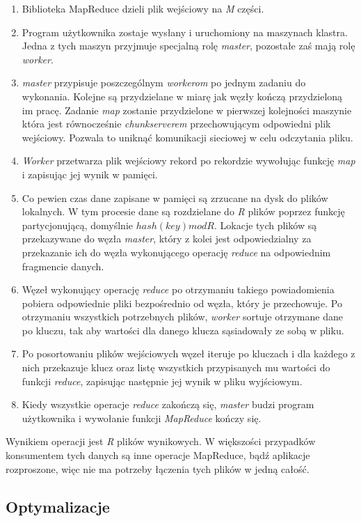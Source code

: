 \begin{enumerate}
 \item Biblioteka MapReduce dzieli plik wejściowy na \emph{M} części.
 \item Program użytkownika zostaje wysłany i uruchomiony na maszynach klastra.
 Jedna z tych maszyn przyjmuje specjalną rolę \emph{master}, pozostałe zaś mają rolę \emph{worker}.
 \item \emph{master} przypisuje poszczególnym \emph{workerom} po jednym zadaniu do wykonania.
 Kolejne są przydzielane w miarę jak węzły kończą przydzieloną im pracę.
 Zadanie \emph{map} zostanie przydzielone w pierwszej kolejności maszynie która jest równocześnie \emph{chunkserverem} przechowującym odpowiedni plik wejściowy.
 Pozwala to uniknąć komunikacji sieciowej w celu odczytania pliku.
 \item \emph{Worker} przetwarza plik wejściowy rekord po rekordzie wywołując funkcję \emph{map} i zapisując jej wynik w pamięci.
 \item Co pewien czas dane zapisane w pamięci są zrzucane na dysk do plików lokalnych.
 W tym procesie dane są rozdzielane do \emph{R} plików poprzez funkcję partycjonującą, domyślnie $hash(key) mod R$.
 Lokacje tych plików są przekazywane do węzła \emph{master}, który z kolei jest odpowiedzialny za przekazanie ich do węzła wykonującego operację \emph{reduce} na odpowiednim fragmencie danych.
 \item Węzeł wykonujący operację \emph{reduce} po otrzymaniu takiego powiadomienia pobiera odpowiednie pliki bezpośrednio od węzła, który je przechowuje.
 Po otrzymaniu wszystkich potrzebnych plików, \emph{worker} sortuje otrzymane dane po kluczu, tak aby wartości dla danego klucza sąsiadowały ze sobą w pliku.
 \item Po posortowaniu plików wejściowych węzeł iteruje po kluczach i dla każdego z nich przekazuje klucz oraz listę wszystkich przypisanych mu wartości do funkcji \emph{reduce}, zapisując następnie jej wynik w pliku wyjściowym.
 \item Kiedy wszystkie operacje \emph{reduce} zakończą się, \emph{master} budzi program użytkownika i wywołanie funkcji \emph{MapReduce} kończy się.
\end{enumerate}

Wynikiem operacji jest \emph{R} plików wynikowych.
W większości przypadków konsumentem tych danych są inne operacje MapReduce, bądź aplikacje rozproszone, więc nie ma potrzeby łączenia tych plików w jedną całość.

\subsection*{Optymalizacje}

